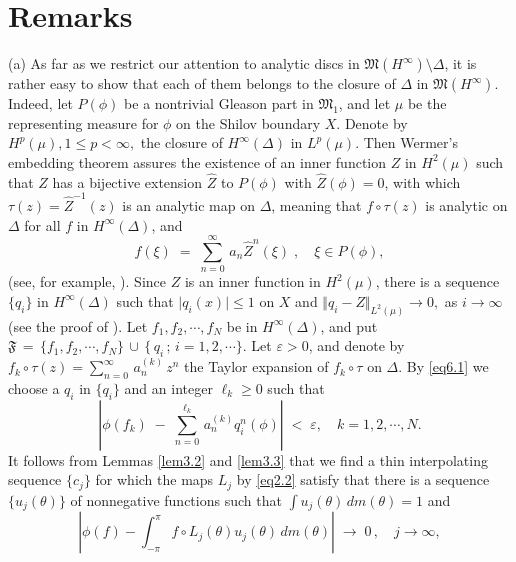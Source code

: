 \documentclass[12pt]{amsart}
\theoremstyle{plain}
\numberwithin{equation}{section}
\begin{document}
\bigskip
\bigskip
\section{Remarks}
\label{S3}

(a) \; As far as we restrict our attention to analytic discs
in $\mathfrak{M}(H^\infty)\setminus \Delta$, it is rather
easy to show that each of them belongs to the closure of
$\Delta$ in $\mathfrak{M}(H^\infty)$.  Indeed, let $P(\phi)$
be a nontrivial Gleason part in $\mathfrak{M}_1$, and let $\mu$
be the representing measure for $\phi$ on the Shilov boundary
$X$. Denote by $H^p(\mu), 1\le p <\infty,$ the closure of
$H^\infty(\Delta)$ in $L^p(\mu)$. Then Wermer's embedding theorem
assures the existence of an inner function $Z$ in $H^2(\mu)$ such
that $Z$ has a bijective extension $\widehat{Z}$ to $P(\phi)$ with
$\widehat{Z}(\phi)=0$, with which $\tau(z)= \widehat{Z}^{-1}(z)$
is an analytic map on $\Delta$, meaning that $f\circ\tau(z)$ is
analytic on $\Delta$ for all $f$ in $H^\infty(\Delta)$, and
\begin{equation}
\label{eq6.1}
f(\xi)\;=\;\sum_{n=0}^{\infty}\, a_n \widehat{Z}^n(\xi)\;,
\quad \xi \in P(\phi),
\end{equation}
(see, for example, \cite[Chapter 6, \S 6.4]{L}). Since $Z$ is an
inner function in $H^2(\mu)$, there is a sequence $\{q_i\}$ in
$H^\infty(\Delta)$ such that $\vert q_i(x) \vert \leq 1$ on $X$
and $\Vert q_i - Z \Vert_{L^2(\mu)} \to 0,$ as $i\to\infty$
(see the proof of \cite[Chapter II, Theorem 7.2]{G1}).
Let $f_1,f_2, \cdots, f_N $ be in $H^\infty(\Delta)$, and put
$\mathfrak{F}\,=\, \{f_1,f_2, \cdots, f_N \}\,\cup\,\{\, q_i
\,;\, i = 1,2, \cdots \}$. Let $\varepsilon >0$, and denote by
$f_k\circ \tau(z)=\sum_{n=0}^{\infty}\, a_n^{(k)}\,z^n$ the Taylor
expansion of $f_k\circ \tau$ on $\Delta$. By \eqref{eq6.1} we
choose a $q_i$ in $\{q_i\}$ and an integer $\ell_k \ge 0$ such that
\begin{equation*}
\left \vert \phi(f_k)\;-\;\sum_{n=0}^{\ell_k}\, a_n^{(k)}
q_i^n(\phi) \right \vert \;<\; \varepsilon, \quad k = 1,2, \cdots, N.
\end{equation*}
It follows from Lemmas \ref{lem3.2} and \ref{lem3.3} that we find a
thin interpolating sequence $\{c_j\}$ for which the maps $L_j$ by
\eqref{eq2.2} satisfy that there is a sequence $\{u_j(\theta)\}$ of
nonnegative functions such that $\int u_j(\theta)\, dm(\theta) =1$ and
\begin{equation*}
\left\vert \phi(f) - \int_{-\pi}^\pi f\circ L_j(\theta)u_j(\theta)
\,dm(\theta)\right \vert \;\to \; 0\,, \quad j\to \infty,
\end{equation*}
\end{document}
